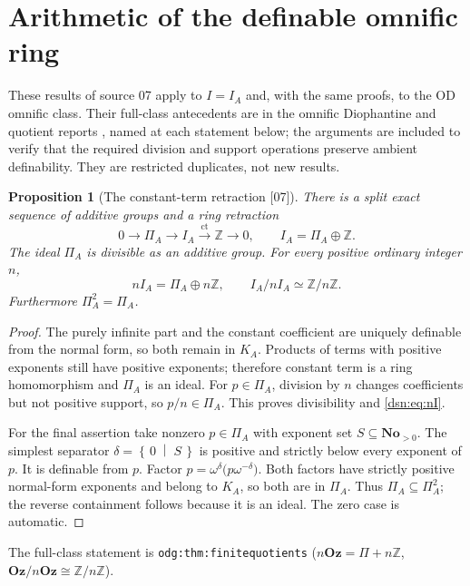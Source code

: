 \documentclass[11pt,a4paper]{article}
\numberwithin{equation}{section}
\newtheorem{proposition}[proposition]{Proposition}
\theoremstyle{definition}
\theoremstyle{remark}
\newcommand{\No}{\mathbf{No}}
\newcommand{\Oz}{\mathbf{Oz}}
\newcommand{\OD}{\mathrm{OD}}
\newcommand{\Z}{\mathbb Z}
\newcommand{\ct}{\operatorname{ct}}
\newcommand{\cut}[2]{\left\{\,#1\;\middle|\;#2\,\right\}}
\newcommand{\src}[1]{\textup{\textsf{\small[#1]}}}
\newcommand{\lbl}[1]{\nolinkurl{#1}}
\begin{document}
\section{Arithmetic of the definable omnific ring}
\label{dsn:sec:arithmetic}

These results of source 07 apply to $I=I_A$ and, with the same proofs, to
the $\OD$ omnific class. Their full-class antecedents are in the omnific
Diophantine and quotient reports \cite{RepoOdg,RepoOsq}, named at each
statement below; the arguments are included to verify that the required
division and support operations preserve ambient definability. They are
restricted duplicates, not new results.

\begin{proposition}[The constant-term retraction \src{07}]\label{dsn:prop:ct}
There is a split exact sequence of additive groups and a ring retraction
\[
 0\longrightarrow\Pi_A\longrightarrow I_A
   \xrightarrow{\ \ct\ }\Z\longrightarrow0,
 \qquad I_A=\Pi_A\oplus\Z.
\]
The ideal $\Pi_A$ is divisible as an additive group. For every positive
ordinary integer $n$,
\begin{equation}\label{dsn:eq:nI}
 nI_A=\Pi_A\oplus n\Z,\qquad I_A/nI_A\simeq\Z/n\Z.
\end{equation}
Furthermore $\Pi_A^2=\Pi_A$.
\end{proposition}
\begin{proof}
The purely infinite part and the constant coefficient are uniquely
definable from the normal form, so both remain in $K_A$. Products of terms
with positive exponents still have positive exponents; therefore constant
term is a ring homomorphism and $\Pi_A$ is an ideal. For $p\in\Pi_A$,
division by $n$ changes coefficients but not positive support, so
$p/n\in\Pi_A$. This proves divisibility and \eqref{dsn:eq:nI}.

For the final assertion take nonzero $p\in\Pi_A$ with exponent set
$S\subseteq\No_{>0}$. The simplest separator $\delta=\cut{0}{S}$ is
positive and strictly below every exponent of $p$. It is definable from
$p$. Factor $p=\omega^\delta\bigl(p\omega^{-\delta}\bigr)$. Both factors
have strictly positive normal-form exponents and belong to $K_A$, so both
are in $\Pi_A$. Thus $\Pi_A\subseteq\Pi_A^2$; the reverse containment
follows because it is an ideal. The zero case is automatic.
\end{proof}

The full-class statement is \lbl{odg:thm:finitequotients} ($n\Oz=\Pi+n\Z$,
$\Oz/n\Oz\cong\Z/n\Z$).
\end{document}
